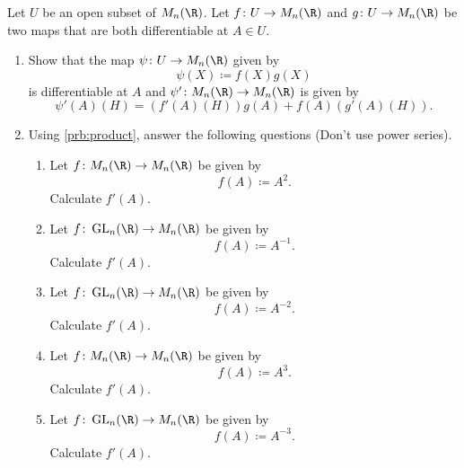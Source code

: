 \documentclass[12pt]{article}
\begin{document}
\begin{problem} \label{prb:product}
    Let $U$ be an open subset of $M_n(\R)$.
    Let $f\colon U \to M_n(\R)$ and $g\colon U \to M_n(\R)$ be two maps
    that are both differentiable at $A \in U$.
    \begin{enumerate}
        \item \label{prb:product:prove}
        Show that the map $\psi\colon U \to M_n(\R)$ given by \[
            \psi(X) \coloneq f(X)g(X)
        \] is differentiable at $A$ and
        $\psi'\colon M_n(\R) \to M_n(\R)$ is given by \[
            \psi'(A)(H) = (f'(A)(H))g(A) + f(A)(g'(A)(H)).
        \]
        \item \label{prb:product:apply}
        Using \cref{prb:product}, answer the
        following questions (Don't use power series).
        \begin{enumerate}
            \item Let $f\colon M_n(\R) \to M_n(\R)$ be given by \[
                f(A) \coloneq A^2.
            \] Calculate $f'(A)$.
            \item Let $f\colon \GL_n(\R) \to M_n(\R)$ be given by \[
                f(A) \coloneq A^{-1}.
            \] Calculate $f'(A)$.
            \item Let $f\colon \GL_n(\R) \to M_n(\R)$ be given by \[
                f(A) \coloneq A^{-2}.
            \] Calculate $f'(A)$.
            \item Let $f\colon M_n(\R) \to M_n(\R)$ be given by \[
                f(A) \coloneq A^3.
            \] Calculate $f'(A)$.
            \item Let $f\colon \GL_n(\R) \to M_n(\R)$ be given by \[
                f(A) \coloneq A^{-3}.
            \] Calculate $f'(A)$.
        \end{enumerate}
    \end{enumerate}
\end{problem}
\end{document}
